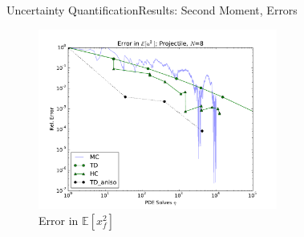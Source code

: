 \documentclass{beamer}
\newcommand{\expv}[1]{\ensuremath{\mathbb{E}[ #1]}}
\begin{document}
\begin{frame}{Uncertainty Quantification}{Results: Second Moment, Errors}
  \begin{figure}[h!]
    \centering
      \includegraphics[width=0.7\textwidth]{../graphics/projectile_errs_aniso_variance}
      \caption{Error in $\expv{x_f^2}$}
  \end{figure}
\end{frame}
\end{document}

